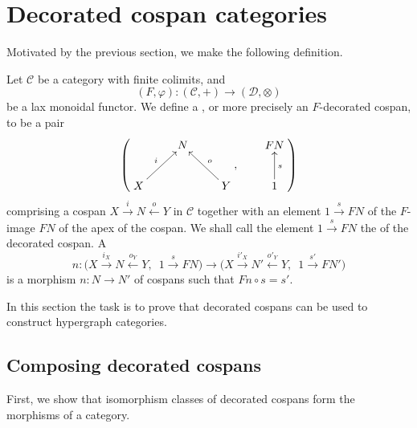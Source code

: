 \section{Decorated cospan categories} \label{sec:dcc}
Motivated by the previous section, we make the following definition.
\begin{definition} \label{def:fcospans}
  Let $\mathcal C$ be a category with finite colimits, and
  \[
    (F,\varphi)\colon  (\mathcal C,+) \longrightarrow (\mathcal D, \otimes)
  \]
  be a lax monoidal functor. We define a , or more
  precisely an $F$-decorated cospan, to be a pair 
  \[
    \left(
    \begin{aligned}
      \xymatrix{
	& N \\  
	X \ar[ur]^{i} && Y \ar[ul]_{o}
      }
    \end{aligned}
    ,
    \qquad
    \begin{aligned}
      \xymatrix{
	FN \\
	1 \ar[u]_{s}
      }
    \end{aligned}
    \right)
  \]
  comprising a cospan $X \stackrel{i}\rightarrow N \stackrel{o}\leftarrow Y$ in
  $\mathcal C$ together with an element $1 \stackrel{s}\rightarrow FN$ of
  the $F$-image $FN$ of the apex of the cospan. We shall call the element $1
  \stackrel{s}\rightarrow FN$ the  of the decorated
  cospan. A 
  \[
    n\colon  \big(X \stackrel{i_X}\longrightarrow N \stackrel{o_Y}\longleftarrow
    Y,\enspace 1 \stackrel{s}\longrightarrow FN\big) \longrightarrow \big(X
    \stackrel{i'_X}\longrightarrow N' \stackrel{o'_Y}\longleftarrow Y,\enspace 1
    \stackrel{s'}\longrightarrow FN'\big)
  \]
  is a morphism $n\colon  N \to N'$ of cospans such that $Fn \circ s = s'$.
\end{definition}
In this section the task is to prove that decorated cospans can be used to
construct hypergraph categories.

\subsection{Composing decorated cospans}

First, we show that isomorphism classes of decorated cospans form the morphisms
of a category.

